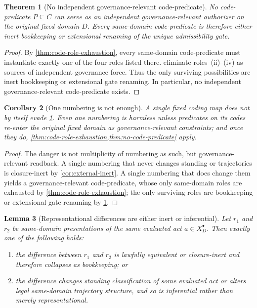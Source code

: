 \documentclass[11pt]{article}
\theoremstyle{plain}
\newtheorem{theorem}{Theorem}[section]
\newtheorem{lemma}[theorem]{Lemma}
\newtheorem{corollary}[theorem]{Corollary}
\theoremstyle{definition}
\newcommand{\Eval}{X_D^{\bullet}}
\newcommand{\domain}{D}
\begin{document}
\begin{theorem}[No independent governance-relevant code-predicate]
\label{thm:no-code-predicate}
No code-predicate $P\subseteq C$ can serve as an independent governance-relevant authorizer on the original fixed domain $\domain$. Every same-domain code-predicate is therefore either inert bookkeeping or extensional renaming of the unique admissibility gate.
\end{theorem}

\begin{proof}
By \cref{thm:code-role-exhaustion}, every same-domain code-predicate must instantiate exactly one of the four roles listed there.  eliminate roles~(ii)--(iv) as sources of independent governance force. Thus the only surviving possibilities are inert bookkeeping or extensional gate renaming. In particular, no independent governance-relevant code-predicate exists.
\end{proof}

\begin{corollary}[One numbering is not enough]
\label{cor:one-numbering}
A single fixed coding map does not by itself evade \cref{thm:no-code-predicate}. Even one numbering is harmless unless predicates on its codes re-enter the original fixed domain as governance-relevant constraints; and once they do, \cref{thm:code-role-exhaustion,thm:no-code-predicate} apply.
\end{corollary}

\begin{proof}
The danger is not multiplicity of numbering as such, but governance-relevant readback. A single numbering that never changes standing or trajectories is closure-inert by \cref{cor:external-inert}. A single numbering that does change them yields a governance-relevant code-predicate, whose only same-domain roles are exhausted by \cref{thm:code-role-exhaustion}; the only surviving roles are bookkeeping or extensional gate renaming by \cref{thm:no-code-predicate}.
\end{proof}

\begin{lemma}[Representational differences are either inert or inferential]
\label{lem:representation-difference}
Let $r_1$ and $r_2$ be same-domain presentations of the same evaluated act $a\in\Eval$. Then exactly one of the following holds:
\begin{enumerate}[label=(\roman*), leftmargin=2.5em]
    \item the difference between $r_1$ and $r_2$ is lawfully equivalent or closure-inert and therefore collapses as bookkeeping; or
    \item the difference changes standing classification of some evaluated act or alters legal same-domain trajectory structure, and so is inferential rather than merely representational.
\end{enumerate}
\end{lemma}
\end{document}

